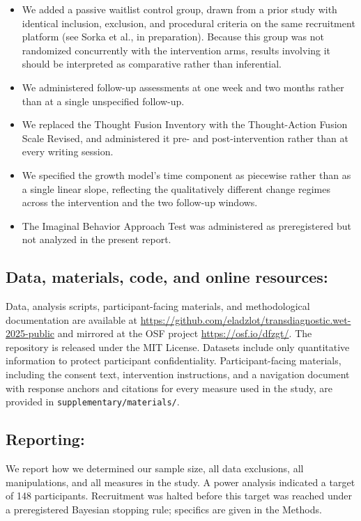 \documentclass[
  man,floatsintext]{apa7}
\providecommand{\tightlist}{%
  \setlength{\itemsep}{0pt}\setlength{\parskip}{0pt}}
\begin{document}
\begin{itemize}
\tightlist
\item
  We added a passive waitlist control group, drawn from a prior study with identical inclusion, exclusion, and procedural criteria on the same recruitment platform (see Sorka et al., in preparation). Because this group was not randomized concurrently with the intervention arms, results involving it should be interpreted as comparative rather than inferential.
\item
  We administered follow-up assessments at one week and two months rather than at a single unspecified follow-up.
\item
  We replaced the Thought Fusion Inventory with the Thought-Action Fusion Scale Revised, and administered it pre- and post-intervention rather than at every writing session.
\item
  We specified the growth model's time component as piecewise rather than as a single linear slope, reflecting the qualitatively different change regimes across the intervention and the two follow-up windows.
\item
  The Imaginal Behavior Approach Test was administered as preregistered but not analyzed in the present report.
\end{itemize}

\subsection{Data, materials, code, and online resources:}\label{data-materials-code-and-online-resources}

Data, analysis scripts, participant-facing materials, and methodological documentation are available at \url{https://github.com/eladzlot/transdiagnostic.wet-2025-public} and mirrored at the OSF project \url{https://osf.io/dfzgt/}.
The repository is released under the MIT License.
Datasets include only quantitative information to protect participant confidentiality.
Participant-facing materials, including the consent text, intervention instructions, and a navigation document with response anchors and citations for every measure used in the study, are provided in \texttt{supplementary/materials/}.

\subsection{Reporting:}\label{reporting}

We report how we determined our sample size, all data exclusions, all manipulations, and all measures in the study.
A power analysis indicated a target of 148 participants.
Recruitment was halted before this target was reached under a preregistered Bayesian stopping rule; specifics are given in the Methods.
\end{document}
